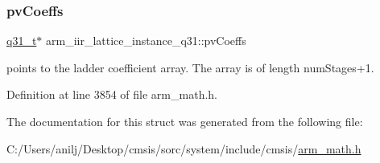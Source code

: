 \mbox{\label{structarm__iir__lattice__instance__q31_a04507e2b982b1dfa97b7b55752dea6b9}} 
\subsubsection{\texorpdfstring{pv\+Coeffs}{pvCoeffs}}
{\footnotesize\ttfamily \hyperlink{arm__math_8h_adc89a3547f5324b7b3b95adec3806bc0}{q31\+\_\+t}$\ast$ arm\+\_\+iir\+\_\+lattice\+\_\+instance\+\_\+q31\+::pv\+Coeffs}

points to the ladder coefficient array. The array is of length num\+Stages+1. 

Definition at line 3854 of file arm\+\_\+math.\+h.



The documentation for this struct was generated from the following file\+:\begin{DoxyCompactItemize}
\item 
C\+:/\+Users/anilj/\+Desktop/cmsis/sorc/system/include/cmsis/\hyperlink{arm__math_8h}{arm\+\_\+math.\+h}\end{DoxyCompactItemize}
